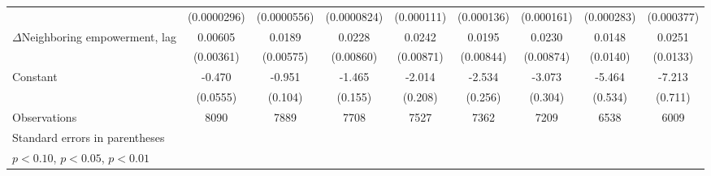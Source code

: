 \begin{table}[htbp]
\begin{tabular}{l*{8}{c}}
                    & (0.0000296)         & (0.0000556)         & (0.0000824)         &  (0.000111)         &  (0.000136)         &  (0.000161)         &  (0.000283)         &  (0.000377)         \\
[1em]
$\Delta$Neighboring empowerment, lag&     0.00605\sym{*}  &      0.0189\sym{***}&      0.0228\sym{***}&      0.0242\sym{***}&      0.0195\sym{**} &      0.0230\sym{***}&      0.0148         &      0.0251\sym{*}  \\
                    &   (0.00361)         &   (0.00575)         &   (0.00860)         &   (0.00871)         &   (0.00844)         &   (0.00874)         &    (0.0140)         &    (0.0133)         \\
[1em]
Constant            &      -0.470\sym{***}&      -0.951\sym{***}&      -1.465\sym{***}&      -2.014\sym{***}&      -2.534\sym{***}&      -3.073\sym{***}&      -5.464\sym{***}&      -7.213\sym{***}\\
                    &    (0.0555)         &     (0.104)         &     (0.155)         &     (0.208)         &     (0.256)         &     (0.304)         &     (0.534)         &     (0.711)         \\
\hline
Observations        &        8090         &        7889         &        7708         &        7527         &        7362         &        7209         &        6538         &        6009         \\
\hline\hline
\multicolumn{9}{l}{\footnotesize Standard errors in parentheses}\\
\multicolumn{9}{l}{\footnotesize \sym{*} \(p<0.10\), \sym{**} \(p<0.05\), \sym{***} \(p<0.01\)}\\
\end{tabular}
\end{table}
